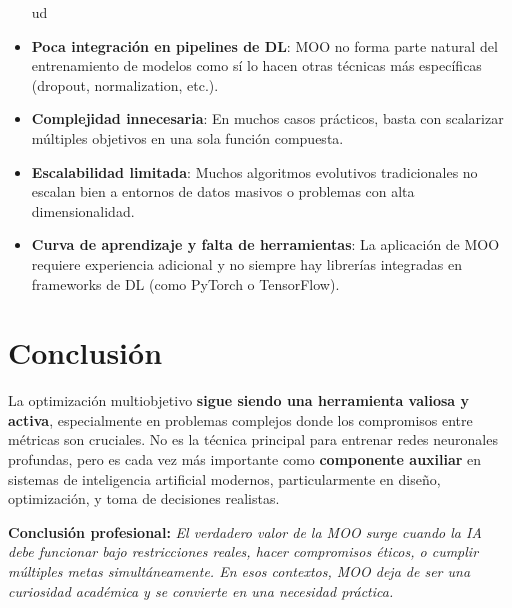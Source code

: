 \documentclass[12pt]{article}
\begin{document}
\begin{itemize}ud
    \item \textbf{Poca integración en pipelines de DL}: MOO no forma parte natural del entrenamiento de modelos como sí lo hacen otras técnicas más específicas (dropout, normalization, etc.).
    
    \item \textbf{Complejidad innecesaria}: En muchos casos prácticos, basta con scalarizar múltiples objetivos en una sola función compuesta.
    
    \item \textbf{Escalabilidad limitada}: Muchos algoritmos evolutivos tradicionales no escalan bien a entornos de datos masivos o problemas con alta dimensionalidad.
    
    \item \textbf{Curva de aprendizaje y falta de herramientas}: La aplicación de MOO requiere experiencia adicional y no siempre hay librerías integradas en frameworks de DL (como PyTorch o TensorFlow).
\end{itemize}

\section*{Conclusión}

La optimización multiobjetivo \textbf{sigue siendo una herramienta valiosa y activa}, especialmente en problemas complejos donde los compromisos entre métricas son cruciales. No es la técnica principal para entrenar redes neuronales profundas, pero es cada vez más importante como \textbf{componente auxiliar} en sistemas de inteligencia artificial modernos, particularmente en diseño, optimización, y toma de decisiones realistas.

\vspace{1em}
\noindent
\textbf{Conclusión profesional:} \emph{El verdadero valor de la MOO surge cuando la IA debe funcionar bajo restricciones reales, hacer compromisos éticos, o cumplir múltiples metas simultáneamente. En esos contextos, MOO deja de ser una curiosidad académica y se convierte en una necesidad práctica.}
\end{document}
